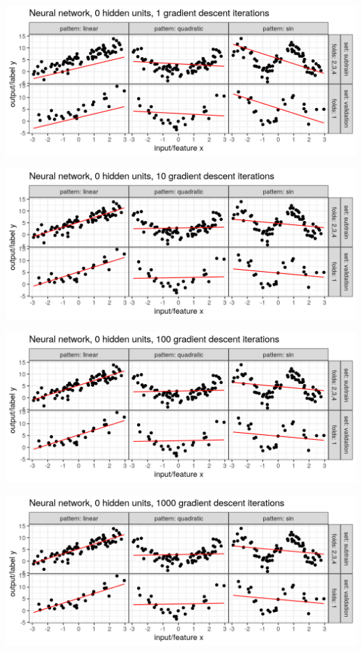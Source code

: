 
\begin{frame}
  \includegraphics[width=\textwidth]{figure-overfitting-pred-units=0-maxit=1.png}
\end{frame}


\begin{frame}
  \includegraphics[width=\textwidth]{figure-overfitting-pred-units=0-maxit=10.png}
\end{frame}


\begin{frame}
  \includegraphics[width=\textwidth]{figure-overfitting-pred-units=0-maxit=100.png}
\end{frame}


\begin{frame}
  \includegraphics[width=\textwidth]{figure-overfitting-pred-units=0-maxit=1000.png}
\end{frame}


